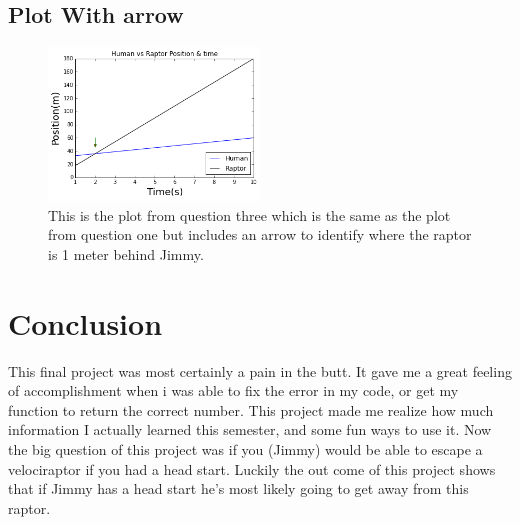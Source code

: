 \documentclass[twocolumn]{revtex4}
\begin{document}
\subsection{Plot With arrow}
\begin{figure}
\includegraphics[width=0.5\textwidth]{Jimmy_Graph_Arrow.png}
\caption{This is the plot from question three which is the same as the plot from question one but includes an arrow to identify where the raptor is 1 meter behind Jimmy.}
\label{fig:Position vs. Time with arrow}
\end{figure}

\section{Conclusion}
This final project was most certainly a pain in the butt. It gave me a great feeling of accomplishment when i was able to fix the error in my code, or get my function to return the correct number. This project made me realize how much information I actually learned this semester, and some fun ways to use it. Now the big question of this project was if you (Jimmy) would be able to escape a velociraptor if you had a head start. Luckily the out come of this project shows that if Jimmy has a head start he's most likely going to get away from this raptor. 
\end{document}
